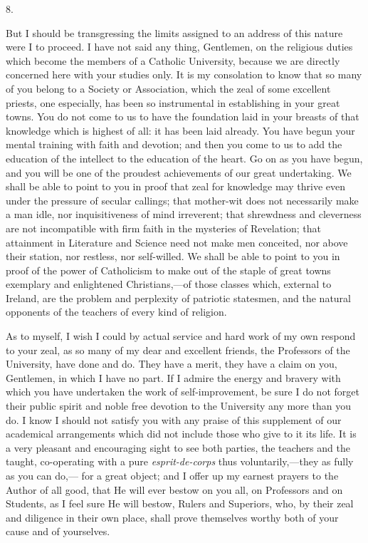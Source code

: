 8.

But I should be transgressing the limits assigned to an address of
this nature were I to proceed. I have not said any thing, Gentlemen,
on the religious duties which become the members of a Catholic
University, because we are directly concerned here with your studies
only. It is my consolation to know that so many of you belong to a
Society or Association, which the zeal of some excellent priests, one
especially, has been so instrumental in establishing in your great
towns. You do not come to us to have the foundation laid in your
breasts of that knowledge which is highest of all: it has been laid
already. You have begun your mental training with faith and
devotion; and then you come to us to add the education of the
intellect to the education of the heart. Go on as you have begun, and
you will be one of the proudest achievements of our great undertaking.
We shall be able to point to you in proof that zeal for knowledge may
thrive even under the pressure of secular callings; that mother-wit
does not necessarily make a man idle, nor inquisitiveness of mind
irreverent; that shrewdness and cleverness are not incompatible with
firm faith in the mysteries of Revelation; that attainment in
Literature and Science need not make men conceited, nor above their
station, nor restless, nor self-willed. We shall be able to point to
you in proof of the power of Catholicism to make out of the staple of
great towns exemplary and enlightened Christians,—of those classes
which, external to Ireland, are the problem and perplexity of
patriotic statesmen, and the natural opponents of the teachers of
every kind of religion.

As to myself, I wish I could by actual service and hard work of my
own respond to your zeal, as so many of my dear and excellent friends,
the Professors of the University, have done and do. They have a merit,
they have a claim on you, Gentlemen, in which I have no part. If I
admire the energy and bravery with which you have undertaken the work
of self-improvement, be sure I do not forget their public spirit and
noble free devotion to the University any more than you do. I know I
should not satisfy you with any praise of this supplement of our
academical arrangements which did not include those who give to it its
life. It is a very pleasant and encouraging sight to see both parties,
the teachers and the taught, co-operating with a pure \emph{esprit-de-corps}
thus voluntarily,—they as fully as you can do,— for a great
object; and I offer up my earnest prayers to the Author of all good,
that He will ever bestow on you all, on Professors and on Students, as
I feel sure He will bestow, Rulers and Superiors, who, by their zeal
and diligence in their own place, shall prove themselves worthy both
of your cause and of yourselves.


